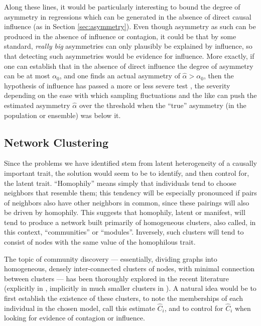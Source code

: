 \documentclass{article}
\begin{document}
\begin{multicols}{2}
Along these lines, it would be particularly interesting to bound the degree of
asymmetry in regressions which can be generated in the absence of direct causal
influence (as in Section \ref{sec:asymmetry}).  Even though asymmetry as such
can be produced in the absence of influence or contagion, it could be that by
some standard, {\em really big} asymmetries can only plausibly be explained by
influence, so that detecting such asymmetries would be evidence for
influence. More exactly, if one can establish that in the absence of direct
influence the degree of asymmetry can be at most $\alpha_0$, and one finds an
actual asymmetry of $\widehat{\alpha} > \alpha_0$, then the hypothesis of
influence has passed a more or less severe test \citep{Mayo-error}, the
severity depending on the ease with which sampling fluctuations and the like
can push the estimated asymmetry $\widehat{\alpha}$ over the threshold when the
``true'' asymmetry (in the population or ensemble) was below it.


\subsection{Network Clustering}
\label{sec:clustering}

Since the problems we have identified stem from latent heterogeneity of a
causally important trait, the solution would seem to be to identify, and then
control for, the latent trait.  ``Homophily'' means simply that individuals
tend to choose neighbors that resemble them; this tendency will be especially
pronounced if pairs of neighbors also have other neighbors in common, since
these pairings will also be driven by homophily. This suggests that homophily,
latent or manifest, will tend to produce a network built primarily of
homogeneous clusters, also called, in this context, ``communities'' or
``modules''.  Inversely, such clusters will tend to consist of nodes with the
same value of the homophilous trait.

The topic of community discovery --- essentially, dividing graphs into
homogeneous, densely inter-connected clusters of nodes, with minimal connection
between clusters --- has been thoroughly explored in the recent literature
(explicitly in \citet{Girvan-MEJN-community-structure,
  MEJN-Girvan-community-structure, Bickel-Chen-on-modularity,
  Porter-Onnela-Mucha-communities, Fortunato-community-detection}, implicitly
in much smaller clusters in \citet{Elwert-Christakis-wives-and-ex-wives}). A
natural idea would be to first establish the existence of these clusters, to
note the memberships of each individual in the chosen model, call this estimate
$\hat{C}_i$, and to control for $\hat{C}_i$ when looking for evidence of
contagion or influence.


\end{multicols}
\end{document}
